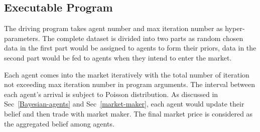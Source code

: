 \documentclass[12pt]{article}
\begin{document}
\subsection{Executable Program}\label{main-executable}
The driving program takes agent number and max iteration number as hyper-parameters. The complete dataset is divided into two parts as random chosen data in the first part would be assigned to agents to form their priors, data in the second part would be fed to agents when they intend to enter the market.

Each agent comes into the market iteratively with the total number of iteration not exceeding max iteration number in program arguments. The interval between each agent's arrival is subject to Poisson distribution.  %
As discussed in Sec~\ref{Bayesian-agents} and Sec~\ref{market-maker}, each agent would update their belief and then trade with market maker. The final market price is considered as the aggregated belief among agents.
\end{document}
